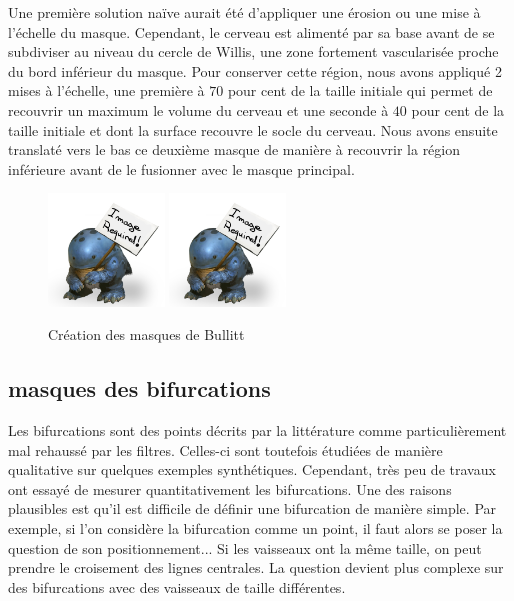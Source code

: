 Une première solution naïve aurait été d'appliquer une érosion ou une mise à l'échelle du masque. Cependant, le cerveau est alimenté par sa base avant de se subdiviser au niveau du cercle de Willis, une zone fortement vascularisée proche du bord inférieur du masque. Pour conserver cette région, nous avons appliqué 2 mises à l'échelle, une première à $70$ pour cent de la taille initiale qui permet de recouvrir un maximum le volume du cerveau et une seconde à $40$ pour cent de la taille initiale et dont la surface recouvre le socle du cerveau. Nous avons ensuite translaté vers le bas ce deuxième masque de manière à recouvrir la région inférieure avant de le fusionner avec le masque principal.


\begin{figure}
  \centering
  \includegraphics[height=3cm]{Images/img_required.jpg}
  \includegraphics[height=3cm]{Images/img_required.jpg}
  \label{fig:masques_Bullitt}
  \caption{Création des masques de Bullitt}
\end{figure}

\subsection{masques des bifurcations}

Les bifurcations sont des points décrits par la littérature comme particulièrement mal rehaussé par les filtres. Celles-ci sont toutefois étudiées de manière qualitative sur quelques exemples synthétiques. Cependant, très peu de travaux ont essayé de mesurer quantitativement les bifurcations. Une des raisons plausibles est qu'il est difficile de définir une bifurcation de manière simple. Par exemple, si l'on considère la bifurcation comme un point, il faut alors se poser la question de son positionnement... Si les vaisseaux ont la même taille, on peut prendre le croisement des lignes centrales. La question devient plus complexe sur des bifurcations avec des vaisseaux de taille différentes.

